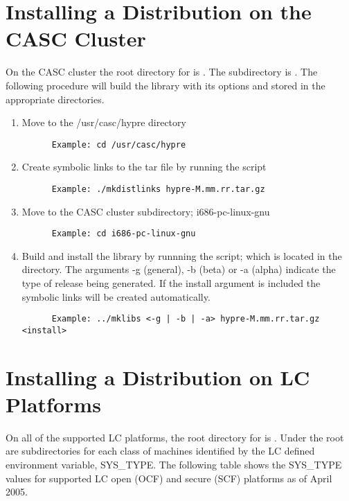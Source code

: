 \section{Installing a Distribution on the CASC Cluster}
\label{Installing a Distribution on the CASC Cluster}

On the CASC cluster the root directory for \hypre{} is .  The 
subdirectory is . The following procedure will build the 
library with its options and stored in the appropriate directories.

\begin{enumerate}
\item Move to the /usr/casc/hypre directory
\begin{verbatim}
      Example: cd /usr/casc/hypre
\end{verbatim}
\item Create symbolic links to the tar file by running the  script
\begin{verbatim}
      Example: ./mkdistlinks hypre-M.mm.rr.tar.gz
\end{verbatim}
\item Move to the CASC cluster subdirectory; i686-pc-linux-gnu
\begin{verbatim}
      Example: cd i686-pc-linux-gnu
\end{verbatim}
\item Build and install the library by runnning the  script; which is
         located in the  directory.
      The arguments -g (general), -b (beta) or -a (alpha) indicate the type of 
          release being generated.  If the install argument is included the 
          symbolic links will be created automatically.
\begin{verbatim}
      Example: ../mklibs <-g | -b | -a> hypre-M.mm.rr.tar.gz <install>
\end{verbatim}
\end{enumerate}

\section{Installing a Distribution on LC Platforms}
\label{Installing a Distribution on LC Platforms}

On all of the supported LC platforms, the root directory for \hypre{} is 
.  Under the root are subdirectories for each class 
of machines identified by the LC defined environment variable, SYS\_TYPE.
The following table shows the SYS\_TYPE values for supported LC open (OCF) 
and secure (SCF) platforms as of April 2005.

